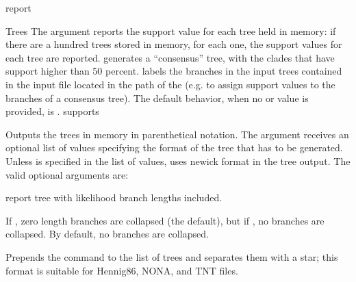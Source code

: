\begin{command}{report}{}
\begin{arguments}
\begin{argumentgroup}{Trees}
{                The argument  reports the support value
                for each tree held in memory: if there are a hundred trees stored 
                in memory, for each one, the support values for each tree are reported. 
                generates a ``consensus'' tree, with the clades that have
                support higher than 50 percent. \poystring labels the branches
                in the input trees contained in the input file located in the path of
                the \poystring (e.g. to assign support values to the branches of a consensus
                tree). The default behavior, when no
                 or  value is
                provided, is .}
                {supports}

                {Outputs the trees in memory in parenthetical notation. The argument
                 receives an optional list of values
                specifying the format of the tree that has to be generated.
                Unless  is specified in the list of values, 
                 uses newick format in the tree output. The
                valid optional arguments are:  
            
                \begin{description}


                        {report tree with likelihood branch lengths included.}
                        {}

                        {If , zero length branches are collapsed (the
                        default), but if , no branches are
                        collapsed.  By default, no branches are collapsed.}
                        {}

                        {Prepends the  command to the list of
                        trees and separates them with a star; this format is
                        suitable for Hennig86, NONA, and TNT files.}
                        {}
                    

\end{description}}
\end{argumentgroup}
\end{arguments}
\end{command}
